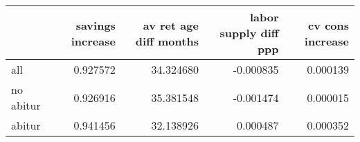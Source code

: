 \begin{tabular}{lrrrr}
\toprule
 & savings increase & av ret age diff months & labor supply diff ppp & cv cons increase \\
\midrule
all & 0.927572 & 34.324680 & -0.000835 & 0.000139 \\
no abitur & 0.926916 & 35.381548 & -0.001474 & 0.000015 \\
abitur & 0.941456 & 32.138926 & 0.000487 & 0.000352 \\
\bottomrule
\end{tabular}
